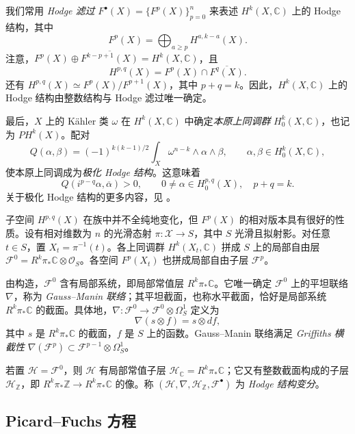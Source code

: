 我们常用 \emph{Hodge 滤过} $F^\bullet(X)=\{F^p(X)\}_{p=0}^n$ 来表述 $H^k(X,\mathbb C)$ 上的 Hodge 结构，其中
\[
F^p(X)=\bigoplus_{a\geq p}H^{a,k-a}(X).
\]
注意，$F^p(X)\oplus\overline{F^{k-p+1}(X)}=H^k(X,\mathbb C)$，且
\[
H^{p,q}(X)=F^p(X)\cap\overline{F^q(X)}.
\]
还有 $H^{p,q}(X)\simeq F^p(X)/F^{p+1}(X)$，其中 $p+q=k$。因此，$H^k(X,\mathbb C)$ 上的 Hodge 结构由整数结构与 Hodge 滤过唯一确定。

最后，$X$ 上的 Kähler 类 $\omega$ 在 $H^k(X,\mathbb C)$ 中确定\emph{本原上同调群} $H_0^k(X,\mathbb C)$，也记为 $PH^k(X)$。配对
\[
Q(\alpha,\beta)=(-1)^{k(k-1)/2}
\int_X\omega^{n-k}\wedge\alpha\wedge\beta,
\qquad\alpha,\beta\in H_0^k(X,\mathbb C),
\]
使本原上同调成为\emph{极化 Hodge 结构}。这意味着
\begin{equation}\label{eq:hodge-polarization}
Q(i^{p-q}\alpha,\overline\alpha)>0,
\qquad0\ne\alpha\in H_0^{p,q}(X),\quad p+q=k.
\end{equation}
关于极化 Hodge 结构的更多内容，见 。

子空间 $H^{p,q}(X)$ 在族中并不全纯地变化，但 $F^p(X)$ 的相对版本具有很好的性质。设有相对维数为 $n$ 的光滑态射 $\pi:\mathcal X\to S$，其中 $S$ 光滑且拟射影。对任意 $t\in S$，置 $X_t=\pi^{-1}(t)$。各上同调群 $H^k(X_t,\mathbb C)$ 拼成 $S$ 上的局部自由层 $\mathcal F^0=R^k\pi_*\mathbb C\otimes\mathcal O_S$。各空间 $F^p(X_t)$ 也拼成局部自由子层 $\mathcal F^p$。

由构造，$\mathcal F^0$ 含有局部系统，即局部常值层 $R^k\pi_*\mathbb C$。它唯一确定 $\mathcal F^0$ 上的平坦联络 $\nabla$，称为 \emph{Gauss--Manin 联络}；其平坦截面，也称水平截面，恰好是局部系统 $R^k\pi_*\mathbb C$ 的截面。具体地，$\nabla:\mathcal F^0\to\mathcal F^0\otimes\Omega_S^1$ 定义为
\[
\nabla(s\otimes f)=s\otimes df,
\]
其中 $s$ 是 $R^k\pi_*\mathbb C$ 的截面，$f$ 是 $S$ 上的函数。Gauss--Manin 联络满足 \emph{Griffiths 横截性}
$\nabla(\mathcal F^p)\subset\mathcal F^{p-1}\otimes\Omega_S^1$。

若置 $\mathcal H=\mathcal F^0$，则 $\mathcal H$ 有局部常值子层 $\mathcal H_{\mathbb C}=R^k\pi_*\mathbb C$；它又有整数截面构成的子层 $\mathcal H_{\mathbb Z}$，即 $R^k\pi_*\mathbb Z\to R^k\pi_*\mathbb C$ 的像。称 $(\mathcal H,\nabla,\mathcal H_{\mathbb Z},\mathcal F^\bullet)$ 为 \emph{Hodge 结构变分}。

\subsection{Picard--Fuchs 方程}\label{subsec:picard-fuchs}

